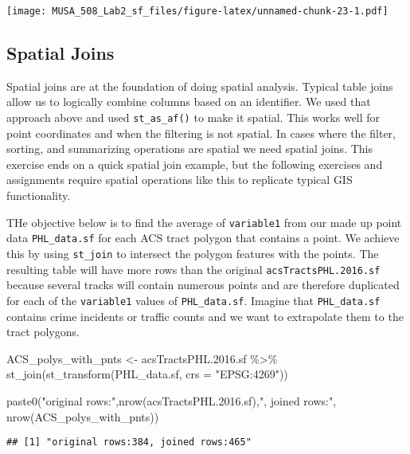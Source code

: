 \documentclass[
]{article}
\newenvironment{Shaded}{\begin{snugshade}}{\end{snugshade}}
\newcommand{\AttributeTok}[1]{\textcolor[rgb]{0.77,0.63,0.00}{#1}}
\newcommand{\FloatTok}[1]{\textcolor[rgb]{0.00,0.00,0.81}{#1}}
\newcommand{\FunctionTok}[1]{\textcolor[rgb]{0.00,0.00,0.00}{#1}}
\newcommand{\NormalTok}[1]{#1}
\newcommand{\OtherTok}[1]{\textcolor[rgb]{0.56,0.35,0.01}{#1}}
\newcommand{\SpecialCharTok}[1]{\textcolor[rgb]{0.00,0.00,0.00}{#1}}
\newcommand{\StringTok}[1]{\textcolor[rgb]{0.31,0.60,0.02}{#1}}
\begin{document}
\texttt{[image: MUSA\_508\_Lab2\_sf\_files/figure-latex/unnamed-chunk-23-1.pdf]}

\hypertarget{spatial-joins}{%
\subsection{Spatial Joins}\label{spatial-joins}}

Spatial joins are at the foundation of doing spatial analysis. Typical
table joins allow us to logically combine columns based on an
identifier. We used that approach above and used \texttt{st\_as\_af()}
to make it spatial. This works well for point coordinates and when the
filtering is not spatial. In cases where the filter, sorting, and
summarizing operations are spatial we need spatial joins. This exercise
ends on a quick spatial join example, but the following exercises and
assignments require spatial operations like this to replicate typical
GIS functionality.

THe objective below is to find the average of \texttt{variable1} from
our made up point data \texttt{PHL\_data.sf} for each ACS tract polygon
that contains a point. We achieve this by using \texttt{st\_join} to
intersect the polygon features with the points. The resulting table will
have more rows than the original \texttt{acsTractsPHL.2016.sf} because
several tracks will contain numerous points and are therefore duplicated
for each of the \texttt{variable1} values of \texttt{PHL\_data.sf}.
Imagine that \texttt{PHL\_data.sf} contains crime incidents or traffic
counts and we want to extrapolate them to the tract polygons.

\begin{Shaded}
\begin{Highlighting}[]
\NormalTok{ACS\_polys\_with\_pnts }\OtherTok{\textless{}{-}}\NormalTok{ acsTractsPHL.}\FloatTok{2016.}\NormalTok{sf }\SpecialCharTok{\%\textgreater{}\%} 
  \FunctionTok{st\_join}\NormalTok{(}\FunctionTok{st\_transform}\NormalTok{(PHL\_data.sf, }\AttributeTok{crs =} \StringTok{"EPSG:4269"}\NormalTok{))}

\FunctionTok{paste0}\NormalTok{(}\StringTok{"original rows:"}\NormalTok{,}\FunctionTok{nrow}\NormalTok{(acsTractsPHL.}\FloatTok{2016.}\NormalTok{sf),}\StringTok{", joined rows:"}\NormalTok{, }\FunctionTok{nrow}\NormalTok{(ACS\_polys\_with\_pnts))}
\end{Highlighting}
\end{Shaded}

\begin{verbatim}
## [1] "original rows:384, joined rows:465"
\end{verbatim}
\end{document}
